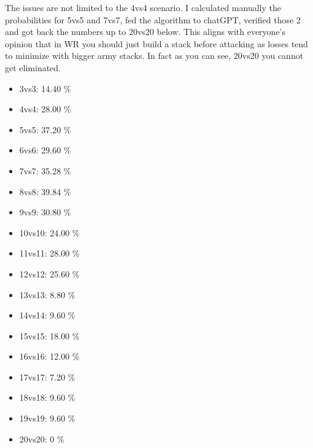 The issues are not limited to the 4vs4 scenario. I calculated manually the probabilities for 5vs5 and 7vs7, fed the algorithm to chatGPT, verified those 2 and got back the numbers up to 20vs20 below. This aligns with everyone's opinion that in WR you should just build a stack before attacking as losses tend to minimize with bigger army stacks. In fact as you can see, 20vs20 you cannot get eliminated.
\begin{itemize}
    \item 3vs3: 14.40 \%
    \item 4vs4: 28.00 \%
    \item 5vs5: 37.20 \%
    \item 6vs6: 29.60 \%
    \item 7vs7: 35.28 \%
    \item 8vs8: 39.84 \%
    \item 9vs9: 30.80 \%
    \item 10vs10: 24.00 \%
    \item 11vs11: 28.00 \%
    \item 12vs12: 25.60 \%
    \item 13vs13: 8.80 \%
    \item 14vs14: 9.60 \%
    \item 15vs15: 18.00 \%
    \item 16vs16: 12.00 \%
    \item 17vs17: 7.20 \%
    \item 18vs18: 9.60 \%
    \item 19vs19: 9.60 \%
    \item 20vs20: 0 \%
\end{itemize}

